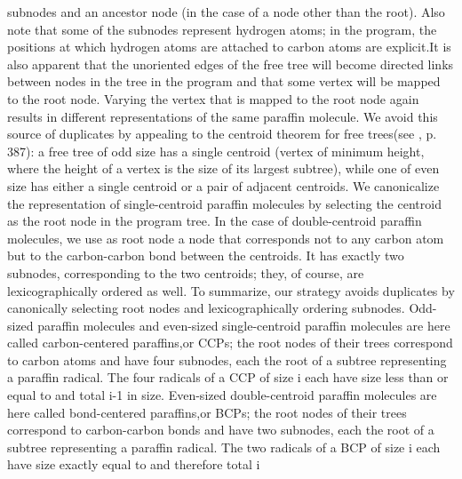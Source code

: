 subnodes and an ancestor node (in the case of a node other than the
root). Also note that some of the subnodes represent hydrogen atoms;
in the program, the positions at which hydrogen atoms are attached
to carbon atoms are explicit.\Endpara[]
\Para[]It is also apparent that the unoriented edges of the free tree
will become directed links between nodes in the tree in the program
and that some vertex will be mapped to the root node. Varying the
vertex that is mapped to the root node again results in different
representations of the same paraffin molecule. We avoid this source
of duplicates by appealing to the \txtxemph[]centroid theorem for
free trees\txtxendemph[] (see %
\Endcit[], \Nobr[]p. 387\Endnobr[]): a free tree of odd size has a
single centroid (vertex of minimum height, where the height of a vertex
is the size of its largest subtree), while one of even size has either
a single centroid or a pair of adjacent centroids. We canonicalize
the representation of single-centroid paraffin molecules by selecting
the centroid as the root node in the program tree. In the case of
double-centroid paraffin molecules, we use as root node a node that
corresponds not to any carbon atom but to the carbon-carbon bond between
the centroids. It has exactly two subnodes, corresponding to the two
centroids; they, of course, are lexicographically ordered as well.%
\Endpara[]
\Para[]To summarize, our strategy avoids duplicates by canonically
selecting root nodes and lexicographically ordering subnodes.%
\Endpara[]
\Para[]Odd-sized paraffin molecules and even-sized single-centroid
paraffin molecules are here called \ldquo[]carbon-centered paraffins,\rdquo[]
or CCPs; the root nodes of their trees correspond to carbon atoms
and have four subnodes, each the root of a subtree representing a
paraffin radical. The four radicals of a CCP of size \InlEqn[]\LmthEqn[]i
\LmthEndeqn[]%
\EndInlEqn[] each have size less than or equal to \InlEqn[]\LmthEqn[]
\left{}
\right\rfloor 
\LmthEndeqn[]%
\EndInlEqn[] and total \InlEqn[]\LmthEqn[]i-1
\LmthEndeqn[]\EndInlEqn[] in size. Even-sized double-centroid
paraffin molecules are here called \ldquo[]bond-centered paraffins,\rdquo[]
or BCPs; the root nodes of their trees correspond to carbon-carbon
bonds and have two subnodes, each the root of a subtree representing
a paraffin radical. The two radicals of a BCP of size \InlEqn[]\LmthEqn[]i
\LmthEndeqn[]%
\EndInlEqn[] each have size exactly equal to \InlEqn[]
\LmthEndeqn[]%
\EndInlEqn[] and therefore total \InlEqn[]\LmthEqn[]i
